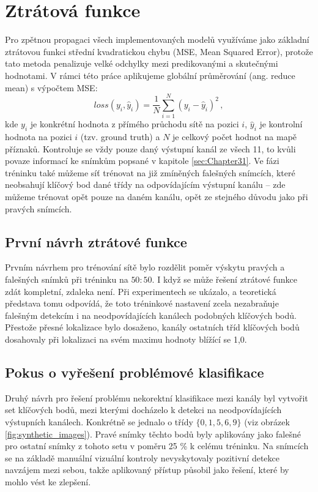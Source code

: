 \section{Ztrátová funkce}
\label{sec:Chapter47}
Pro zpětnou propagaci všech implementovaných modelů využíváme jako základní ztrátovou funkci střední kvadratickou chybu (MSE, Mean Squared Error), protože tato metoda penalizuje velké odchylky mezi predikovanými a skutečnými hodnotami.  V rámci této práce aplikujeme globální průměrování (ang. reduce mean) s výpočtem MSE:
\begin{equation}
    loss(y_i, \hat{y}_i) = \frac{1}{N} \sum_{i=1}^{N} (y_i - \hat{y}_i)^2 \,,
\end{equation}
kde $y_i$ je konkrétní hodnota z přímého průchodu sítě na pozici $i$, $\hat{y}_i$ je kontrolní hodnota na pozici $i$ (tzv. ground truth) a $N$ je celkový počet hodnot na mapě příznaků. Kontroluje se vždy pouze daný výstupní kanál ze všech 11, to kvůli povaze informací ke snímkům popsané v kapitole \ref{sec:Chapter31}. Ve fázi tréninku také můžeme síť trénovat na již zmíněných falešných snímcích, které neobsahují klíčový bod dané třídy na odpovídajícím výstupní kanálu -- zde můžeme trénovat opět pouze na daném kanálu, opět ze stejného důvodu jako při pravých snímcích.

\subsection{První návrh ztrátové funkce}

Prvním návrhem pro trénování sítě bylo rozdělit poměr výskytu pravých a falešných snímků při tréninku na $50:50$. I když se může řešení ztrátové funkce zdát kompletní, zdaleka není. Při experimentech se ukázalo, a teoretická představa tomu odpovídá, že toto tréninkové nastavení zcela nezabraňuje falešným detekcím i na neodpovídajících kanálech podobných klíčových bodů. Přestože přesné lokalizace bylo dosaženo, kanály ostatních tříd klíčových bodů dosahovaly při lokalizaci na svém maximu hodnoty blížící se 1,0.

\subsection{Pokus o vyřešení problémové klasifikace}

Druhý návrh pro řešení problému nekorektní klasifikace mezi kanály byl vytvořit set klíčových bodů, mezi kterými docházelo k detekci na neodpovídajících výstupních kanálech. Konkrétně se jednalo o třídy $\{0, 1, 5, 6, 9\}$ (viz obrázek \ref{fig:synthetic_images}). Pravé snímky těchto bodů byly aplikovány jako falešné pro ostatní snímky z tohoto setu v poměru 25 \% k celému tréninku. Na snímcích se na základě manuální vizuální kontroly nevyskytovaly pozitivní detekce navzájem mezi sebou, takže aplikovaný přístup působil jako řešení, které by mohlo vést ke zlepšení.

